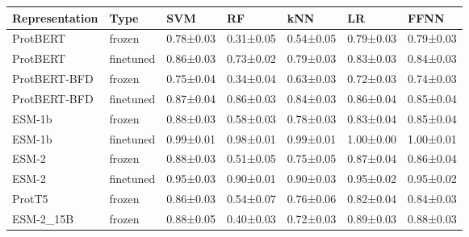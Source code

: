 \begin{tabular}{lllllll}
\toprule
Representation &      Type &       SVM &        RF &       kNN &        LR &      FFNN \\
\midrule
      ProtBERT &    frozen & 0.78±0.03 & 0.31±0.05 & 0.54±0.05 & 0.79±0.03 & 0.79±0.03 \\
      ProtBERT & finetuned & 0.86±0.03 & 0.73±0.02 & 0.79±0.03 & 0.83±0.03 & 0.84±0.03 \\
  ProtBERT-BFD &    frozen & 0.75±0.04 & 0.34±0.04 & 0.63±0.03 & 0.72±0.03 & 0.74±0.03 \\
  ProtBERT-BFD & finetuned & 0.87±0.04 & 0.86±0.03 & 0.84±0.03 & 0.86±0.04 & 0.85±0.04 \\
        ESM-1b &    frozen & 0.88±0.03 & 0.58±0.03 & 0.78±0.03 & 0.83±0.04 & 0.85±0.04 \\
        ESM-1b & finetuned & 0.99±0.01 & 0.98±0.01 & 0.99±0.01 & 1.00±0.00 & 1.00±0.01 \\
         ESM-2 &    frozen & 0.88±0.03 & 0.51±0.05 & 0.75±0.05 & 0.87±0.04 & 0.86±0.04 \\
         ESM-2 & finetuned & 0.95±0.03 & 0.90±0.01 & 0.90±0.03 & 0.95±0.02 & 0.95±0.02 \\
        ProtT5 &    frozen & 0.86±0.03 & 0.54±0.07 & 0.76±0.06 & 0.82±0.04 & 0.84±0.03 \\
     ESM-2_15B &    frozen & 0.88±0.05 & 0.40±0.03 & 0.72±0.03 & 0.89±0.03 & 0.88±0.03 \\
\bottomrule
\end{tabular}
